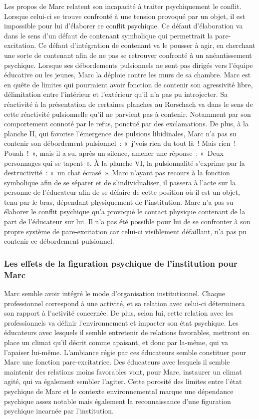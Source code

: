 \documentclass[12pt, a4paper]{book}
\begin{document}
\begin{spacing}{1.5}
Les propos de Marc relatent son incapacité à traiter psychiquement le conflit. Lorsque celui-ci se trouve confronté à une tension provoqué par un objet, il est impossible pour lui d'élaborer ce conflit psychique. Ce défaut d'élaboration va dans le sens d'un défaut de contenant symbolique qui permettrait la pare-excitation. Ce défaut d'intégration de contenant va le pousser à agir, en cherchant une sorte de contenant afin de ne pas se retrouver confronté à un anéantissement psychique. Lorsque ses débordements pulsionnels ne sont pas dirigés vers l'équipe éducative ou les jeunes, Marc la déploie contre les murs de sa chambre. Marc est en quête de limites qui pourraient avoir fonction de contenir son agressivité libre, délimitation entre l'intérieur et l'extérieur qu'il n'a pas pu introjecter. Sa réactivité à la présentation de certaines planches au Rorschach va dans le sens de cette réactivité pulsionnelle qu'il ne parvient pas à contenir. Notamment par son comportement connoté par le refus, ponctué par des exclamations. De plus, à la planche II, qui favorise l'émergence des pulsions libidinales, Marc n'a pas su contenir son débordement pulsionnel : « j'vois rien du tout là ! Mais rien ! Pouah ! », mais il a su, après un silence, amener une réponse : « Deux personnages qui se tapent ». À la planche VI, la pulsionnalité s'exprime par la destructivité : « un chat écrasé ». Marc n'ayant pas recours à la fonction symbolique  afin de se séparer et de s'individualiser, il passera à l'acte sur la personne de l'éducateur afin de se défaire de cette position où il est un objet, tenu par le bras, dépendant physiquement de l'institution. Marc n'a pas su élaborer le conflit psychique qu'a provoqué le contact physique contenant de la part de l'éducateur sur lui. Il n'a pas été possible pour lui de se confronter à son propre système de pare-excitation car celui-ci visiblement défaillant, n'a pas pu contenir ce débordement pulsionnel.

\subsubsection{Les effets de la figuration psychique  de l'institution pour Marc}

Marc semble avoir intégré le mode d'organisation institutionnel. Chaque professionnel correspond à une activité, et sa relation avec celui-ci déterminera son rapport à l'activité concernée. De plus, selon lui, cette relation avec les professionnels va définir l'environnement et impacter son état psychique. Les éducateurs avec lesquels il semble entretenir de relations favorables, mettront en place un climat qu'il décrit comme apaisant, et donc par la-même, qui va l'apaiser lui-même. L'ambiance régie par ces éducateurs semble constituer pour Marc une fonction pare-excitatrice. Des éducateurs avec lesquels il semble maintenir des relations moins favorables vont, pour Marc, instaurer un climat agité, qui va également sembler l'agiter. Cette porosité des limites entre l'état psychique de Marc et le contexte environnemental marque une dépendance psychique assez notable mais également la reconnaissance d'une figuration psychique incarnée par l'institution.


\end{spacing}
\end{document}
